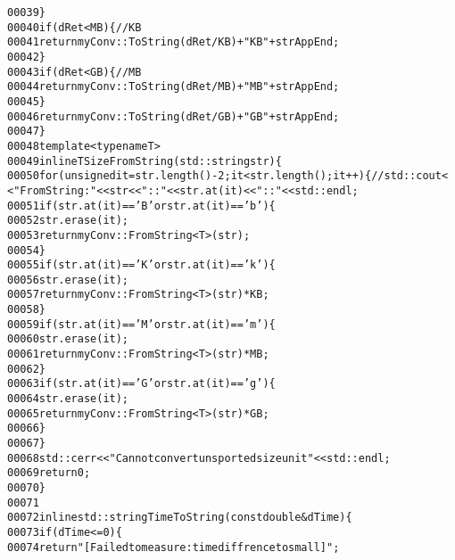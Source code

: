 \begin{footnotesize}
\begin{alltt}
00039         \}
00040         \textcolor{keywordflow}{if} ( dRet < MB )\{\textcolor{comment}{//KB}
00041             \textcolor{keywordflow}{return} myConv::ToString(dRet/KB)+\textcolor{stringliteral}{"KB"}+strAppEnd;
00042         \}
00043         \textcolor{keywordflow}{if}( dRet < GB )\{\textcolor{comment}{//MB}
00044             \textcolor{keywordflow}{return} myConv::ToString(dRet/MB)+\textcolor{stringliteral}{"MB"}+strAppEnd;
00045         \}
00046         \textcolor{keywordflow}{return} myConv::ToString(dRet/GB)+\textcolor{stringliteral}{"GB"}+strAppEnd;
00047     \}
00048     \textcolor{keyword}{template} <\textcolor{keyword}{typename} T>
00049     \textcolor{keyword}{inline} T SizeFromString(std::string str)\{
00050         \textcolor{keywordflow}{for} (\textcolor{keywordtype}{unsigned} it = str.length()-2; it < str.length(); it++)\{ \textcolor{comment}{//std::cout<
      <"FromString: "<<str<<"::"<<str.at(it)<<"::"<<std::endl;}
00051                 \textcolor{keywordflow}{if}(str.at(it) == \textcolor{charliteral}{'B'} or str.at(it) == \textcolor{charliteral}{'b'})\{
00052                     str.erase(it);
00053                     \textcolor{keywordflow}{return} myConv::FromString<T>(str);
00054                 \}
00055                 \textcolor{keywordflow}{if}(str.at(it) == \textcolor{charliteral}{'K'} or str.at(it) == \textcolor{charliteral}{'k'})\{
00056                     str.erase(it);
00057                     \textcolor{keywordflow}{return} myConv::FromString<T>(str) * KB;
00058                 \}
00059                 \textcolor{keywordflow}{if}(str.at(it) == \textcolor{charliteral}{'M'} or str.at(it) == \textcolor{charliteral}{'m'})\{
00060                     str.erase(it);
00061                     \textcolor{keywordflow}{return} myConv::FromString<T>(str) * MB;
00062                 \}
00063                 \textcolor{keywordflow}{if}(str.at(it) == \textcolor{charliteral}{'G'} or str.at(it) == \textcolor{charliteral}{'g'})\{
00064                     str.erase(it);
00065                     \textcolor{keywordflow}{return} myConv::FromString<T>(str) * GB;
00066                 \}
00067         \}
00068         std::cerr<<\textcolor{stringliteral}{"Cannot convert unsported size unit"}<<std::endl;
00069         \textcolor{keywordflow}{return} 0;
00070     \}
00071 
00072     \textcolor{keyword}{inline} std::string TimeToString(\textcolor{keyword}{const} \textcolor{keywordtype}{double} &dTime)\{
00073         \textcolor{keywordflow}{if} ( dTime <= 0)\{
00074             \textcolor{keywordflow}{return} \textcolor{stringliteral}{"[Failed to measure: time diffrence to small]"};

\end{alltt}
\end{footnotesize}
